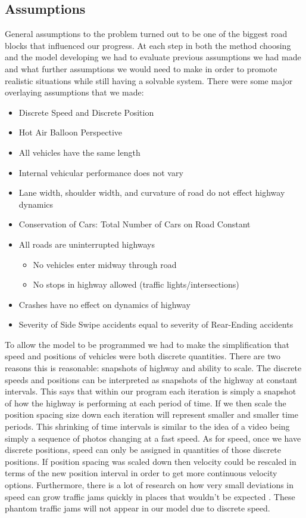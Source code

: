 \documentclass{amsart}
\begin{document}
	\subsection{Assumptions}
		General assumptions to the problem turned out to be one of the biggest road blocks that influenced our progress.  At each step in both the method choosing and the model developing we had to evaluate previous assumptions we had made and what further assumptions we would need to make in order to promote realistic situations while still having a solvable system.  There were some major overlaying assumptions that we made:
		\begin{itemize}
			\item  	Discrete Speed and Discrete Position
			\item  Hot Air Balloon Perspective
			\item 	All vehicles have the same length 
			\item 	Internal vehicular performance does not vary
			\item  Lane width, shoulder width, and curvature of road do not effect highway dynamics
			\item 	Conservation of Cars: Total Number of Cars on Road Constant
			
			\item  	All roads are uninterrupted highways
				\begin{itemize}
					\item 	No vehicles enter midway through road
					\item 	No stops in highway allowed (traffic lights/intersections) 
				\end{itemize}
			\item   Crashes have no effect on dynamics of highway
			\item 	Severity of Side Swipe accidents equal to severity of Rear-Ending accidents			
		\end{itemize}
		 

		To allow the model to be programmed we had to make the simplification that speed and positions of vehicles were both discrete quantities.  There are two reasons this is reasonable: snapshots of highway and ability to scale.  The discrete speeds and positions can be interpreted as snapshots of the highway at constant intervals.  This says that within our program each iteration is simply a snapshot of how the highway is performing at each period of time.  If we then scale the position spacing size down each iteration will represent smaller and smaller time periods.  This shrinking of time intervals is similar to the idea of a video being simply a sequence of photos changing at a fast speed.  As for speed, once we have discrete positions, speed can only be assigned in quantities of those discrete positions.  If position spacing was scaled down then velocity could be rescaled in terms of the new position interval in order to get more continuous velocity options. Furthermore, there is a lot of research on how very small deviations in speed can grow traffic jams quickly in places that wouldn't be expected \cite{kurttraffic}.  These phantom traffic jams will not appear in our model due to discrete speed.
	
\end{document}
